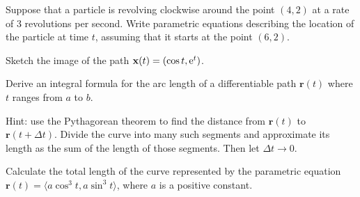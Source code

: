 \documentclass[prettycode,shellescape]{watsonbook}
\begin{document}
\begin{aexercise}
  Suppose that a particle is revolving clockwise around the point
  $(4,2)$ at a rate of 3 revolutions per second. Write parametric
  equations describing the location of the particle at time $t$,
  assuming that it starts at the point $(6,2)$.
\end{aexercise}

\begin{aexercise}
  Sketch the image of the path $\mathbf{x}(t)=(\cos t, \mathrm{e}^t)$.
\end{aexercise}

\begin{aexercise}
  Derive an integral formula for the arc length of a differentiable
  path $\mathbf{r}(t)$ where $t$ ranges from $a$ to $b$.

  Hint: use the Pythagorean theorem to find the distance from
  $\mathbf{r}(t)$ to $\mathbf{r}(t+\Delta t)$. Divide the curve into
  many such segments and approximate its length as the sum of the
  length of those segments. Then let $\Delta t \to 0$. 
\end{aexercise}

\begin{aexercise}
  Calculate the total length of the curve represented by the
  parametric equation $\mathbf{r}(t) = \langle a\cos^3t, a\sin^3 t \rangle$,
  where $a$ is a positive constant.
\end{aexercise}
\end{document}
